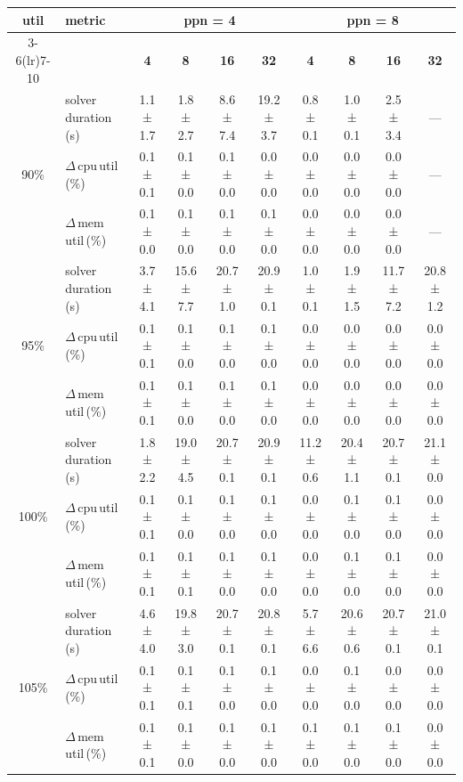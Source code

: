\begin{tabular}{@{}c l *{8}{c}@{}}
\toprule
\multirow{2}{*}{\textbf{util}} & \multirow{2}{*}{\textbf{metric}} &\multicolumn{4}{c}{\textbf{ppn = 4}} & \multicolumn{4}{c}{\textbf{ppn = 8}}\\
\cmidrule(lr){3-6}\cmidrule(lr){7-10}
 &  & \textbf{4} & \textbf{8} & \textbf{16} & \textbf{32} & \textbf{4} & \textbf{8} & \textbf{16} & \textbf{32}\\
\midrule
\multirow{3}{*}{90\%}
& solver\,duration\,(s) & 1.1 ± 1.7 & 1.8 ± 2.7 & 8.6 ± 7.4 & 19.2 ± 3.7 & 0.8 ± 0.1 & 1.0 ± 0.1 & 2.5 ± 3.4 & \multicolumn{1}{c}{—} \\
& $\Delta$\,cpu\,util\,(\%) & 0.1 ± 0.1 & 0.1 ± 0.0 & 0.1 ± 0.0 & 0.0 ± 0.0 & 0.0 ± 0.0 & 0.0 ± 0.0 & 0.0 ± 0.0 & \multicolumn{1}{c}{—} \\
& $\Delta$\,mem\,util\,(\%) & 0.1 ± 0.0 & 0.1 ± 0.0 & 0.1 ± 0.0 & 0.1 ± 0.0 & 0.0 ± 0.0 & 0.0 ± 0.0 & 0.0 ± 0.0 & \multicolumn{1}{c}{—} \\
\midrule
\multirow{3}{*}{95\%}
& solver\,duration\,(s) & 3.7 ± 4.1 & 15.6 ± 7.7 & 20.7 ± 1.0 & 20.9 ± 0.1 & 1.0 ± 0.1 & 1.9 ± 1.5 & 11.7 ± 7.2 & 20.8 ± 1.2 \\
& $\Delta$\,cpu\,util\,(\%) & 0.1 ± 0.1 & 0.1 ± 0.0 & 0.1 ± 0.0 & 0.1 ± 0.0 & 0.0 ± 0.0 & 0.0 ± 0.0 & 0.0 ± 0.0 & 0.0 ± 0.0 \\
& $\Delta$\,mem\,util\,(\%) & 0.1 ± 0.1 & 0.1 ± 0.0 & 0.1 ± 0.0 & 0.1 ± 0.0 & 0.0 ± 0.0 & 0.0 ± 0.0 & 0.0 ± 0.0 & 0.0 ± 0.0 \\
\midrule
\multirow{3}{*}{100\%}
& solver\,duration\,(s) & 1.8 ± 2.2 & 19.0 ± 4.5 & 20.7 ± 0.1 & 20.9 ± 0.1 & 11.2 ± 0.6 & 20.4 ± 1.1 & 20.7 ± 0.1 & 21.1 ± 0.0 \\
& $\Delta$\,cpu\,util\,(\%) & 0.1 ± 0.1 & 0.1 ± 0.0 & 0.1 ± 0.0 & 0.1 ± 0.0 & 0.0 ± 0.0 & 0.1 ± 0.0 & 0.1 ± 0.0 & 0.0 ± 0.0 \\
& $\Delta$\,mem\,util\,(\%) & 0.1 ± 0.1 & 0.1 ± 0.1 & 0.1 ± 0.0 & 0.1 ± 0.0 & 0.0 ± 0.0 & 0.1 ± 0.0 & 0.1 ± 0.0 & 0.0 ± 0.0 \\
\midrule
\multirow{3}{*}{105\%}
& solver\,duration\,(s) & 4.6 ± 4.0 & 19.8 ± 3.0 & 20.7 ± 0.1 & 20.8 ± 0.1 & 5.7 ± 6.6 & 20.6 ± 0.6 & 20.7 ± 0.1 & 21.0 ± 0.1 \\
& $\Delta$\,cpu\,util\,(\%) & 0.1 ± 0.1 & 0.1 ± 0.1 & 0.1 ± 0.0 & 0.1 ± 0.0 & 0.0 ± 0.0 & 0.1 ± 0.0 & 0.0 ± 0.0 & 0.0 ± 0.0 \\
& $\Delta$\,mem\,util\,(\%) & 0.1 ± 0.1 & 0.1 ± 0.0 & 0.1 ± 0.0 & 0.1 ± 0.0 & 0.1 ± 0.0 & 0.1 ± 0.0 & 0.1 ± 0.0 & 0.0 ± 0.0 \\
\bottomrule
\end{tabular}
